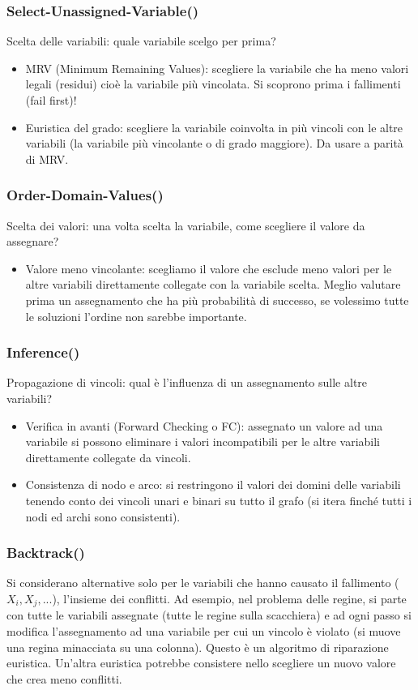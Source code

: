 \documentclass{article}
\begin{document}
\subsubsection{Select-Unassigned-Variable()}
Scelta delle variabili: quale variabile scelgo per prima?
\begin{itemize}
    \item MRV (Minimum Remaining Values): scegliere la variabile che ha meno valori legali (residui) cioè la variabile più vincolata. Si scoprono prima i fallimenti (fail first)!
    \item Euristica del grado: scegliere la variabile coinvolta in più vincoli con le altre variabili (la variabile più vincolante o di grado maggiore). Da usare a parità di MRV.
\end{itemize}

\subsubsection{Order-Domain-Values()}
Scelta dei valori: una volta scelta la variabile, come scegliere il valore da assegnare?
\begin{itemize}
    \item Valore meno vincolante: scegliamo il valore che esclude meno valori per le altre variabili direttamente collegate con la variabile scelta. Meglio valutare prima un assegnamento che ha più probabilità di successo, se volessimo tutte le soluzioni l’ordine non sarebbe importante.
\end{itemize}

\subsubsection{Inference()}
Propagazione di vincoli: qual è l'influenza di un assegnamento sulle altre variabili?
\begin{itemize}
    \item Verifica in avanti (Forward Checking o FC): assegnato un valore ad una variabile si possono eliminare i valori incompatibili per le altre variabili direttamente collegate da vincoli.
    \item Consistenza di nodo e arco: si restringono il valori dei domini delle variabili tenendo conto dei vincoli unari e binari su tutto il grafo (si itera finché tutti i nodi ed archi sono consistenti).
\end{itemize}

\subsubsection{Backtrack()}
Si considerano alternative solo per le variabili che hanno causato il fallimento ($X_i, X_j, ...$), l’insieme dei conflitti. Ad esempio, nel problema delle regine, si parte con tutte le variabili assegnate (tutte le regine sulla scacchiera) e ad ogni passo si modifica l’assegnamento ad una variabile per cui un vincolo è violato (si muove una regina minacciata su una colonna). Questo è un algoritmo di riparazione euristica. \newline 
Un’altra euristica potrebbe consistere nello scegliere un nuovo valore che crea meno conflitti.
\end{document}
